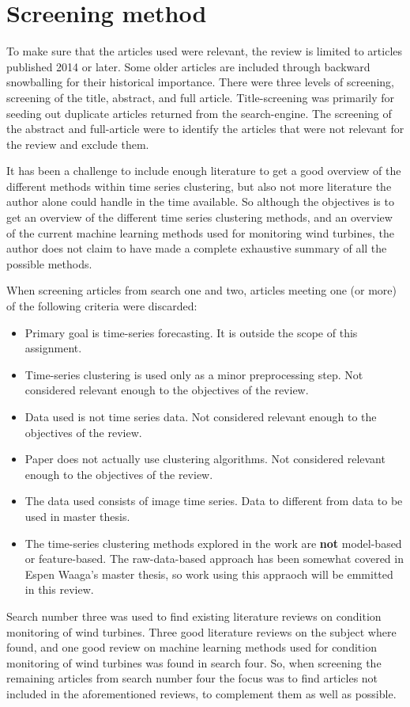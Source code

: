 \section{Screening method}
To make sure that the articles used were relevant, the review is limited to articles published 2014 or later. Some older articles are included through backward snowballing for their historical importance. There were three levels of screening, screening of the title, abstract, and full article. Title-screening was primarily for seeding out duplicate articles returned from the search-engine. The screening of the abstract and full-article were to identify the articles that were not relevant for the review and exclude them. \bigskip

It has been a challenge to include enough literature to get a good overview of the different methods within time series clustering, but also not more literature the author alone could handle in the time available. So although the objectives is to get an overview of the different time series clustering methods, and an overview of the current machine learning methods used for monitoring wind turbines, the author does not claim to have made a complete exhaustive summary of all the possible methods. \bigskip

When screening articles from search one and two, articles meeting one (or more) of the following criteria were discarded: 
\begin{itemize}
    \item Primary goal is time-series forecasting. It is outside the scope of this assignment.
    \item Time-series clustering is used only as a minor preprocessing step. Not considered relevant enough to the objectives of the review.
    \item Data used is not time series data. Not considered relevant enough to the objectives of the review.
    \item Paper does not actually use clustering algorithms. Not considered relevant enough to the objectives of the review.
    \item The data used consists of image time series. Data to different from data to be used in master thesis.
    \item The time-series clustering methods explored in the work are \textbf{not} model-based or feature-based. The raw-data-based approach has been somewhat covered in Espen Waaga's master thesis, so work using this appraoch will be emmitted in this review.
\end{itemize}

Search number three was used to find existing literature reviews on condition monitoring of wind turbines. Three good literature reviews on the subject where found, and one good review on machine learning methods used for condition monitoring of wind turbines was found in search four. So, when screening the remaining articles from search number four the focus was to find articles not included in the aforementioned reviews, to complement them as well as possible. \bigskip

